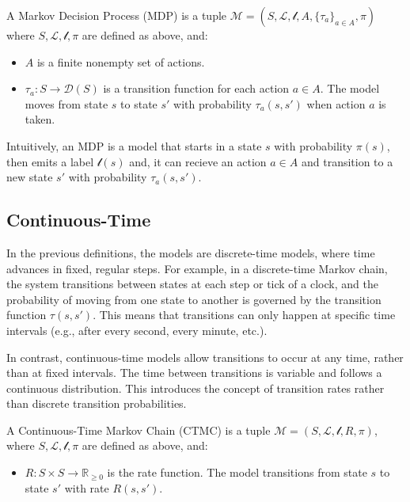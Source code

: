 \begin{definition}
    A Markov Decision Process (MDP) is a tuple $\mathcal{M} = (S, \mathcal{L}, \mathcal{l}, A, \{\tau_a\}_{a \in A}, \pi)$ where $S, \mathcal{L}, \mathcal{l}, \pi$ are defined as above, and:
    \begin{itemize}
        \item $A$ is a finite nonempty set of actions.
        \item $\tau_a: S \rightarrow \mathcal{D}(S)$ is a transition function for each action $a \in A$. The model moves from state $s$ to state $s'$ with probability $\tau_a(s, s')$ when action $a$ is taken.
    \end{itemize}
\end{definition}


Intuitively, an MDP is a model that starts in a state $s$ with probability $\pi(s)$, then emits a label $\mathcal{l}(s)$ and, it can recieve an action $a \in A$ and transition to a new state $s'$ with probability $\tau_a(s, s')$. 


\subsection{Continuous-Time}
In the previous definitions, the models are discrete-time models, where time advances in fixed, regular steps. 
For example, in a discrete-time Markov chain, the system transitions between states at each step or tick of a clock, and the probability of moving from one state to another is governed by the transition function $\tau(s, s')$. 
This means that transitions can only happen at specific time intervals (e.g., after every second, every minute, etc.).

In contrast, continuous-time models allow transitions to occur at any time, rather than at fixed intervals. 
The time between transitions is variable and follows a continuous distribution. 
This introduces the concept of transition rates rather than discrete transition probabilities.


\begin{definition}
    A Continuous-Time Markov Chain (CTMC) is a tuple $\mathcal{M} = (S, \mathcal{L}, \mathcal{l}, R, \pi)$, where $S, \mathcal{L}, \mathcal{l}, \pi$ are defined as above, and:
    \begin{itemize}
        \item $R: S \times S \rightarrow \mathbb{R}_{\geq 0}$ is the rate function. The model transitions from state $s$ to state $s'$ with rate $R(s, s')$.
    \end{itemize}
\end{definition}


